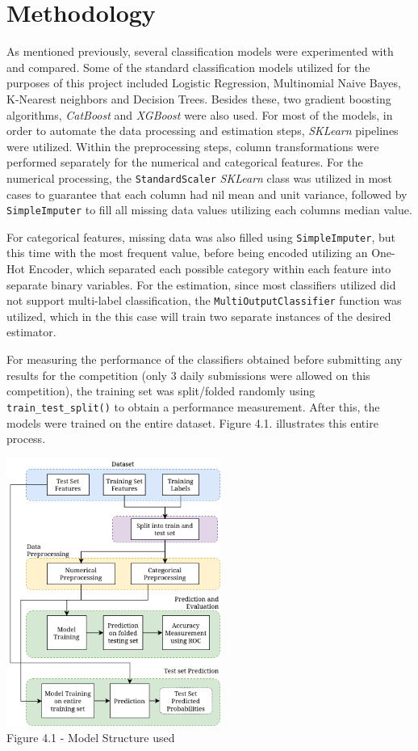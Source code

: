 \documentclass{IEEEtran}
\begin{document}
\section{Methodology}
As mentioned previously, several classification models were experimented with and compared. Some of the standard classification models utilized for the purposes of this project included Logistic Regression, Multinomial Naive Bayes, K-Nearest neighbors and Decision Trees. Besides these, two gradient boosting algorithms, \textit{CatBoost} and \textit{XGBoost} were also used.
For most of the models, in order to automate the data processing and estimation steps, \textit{SKLearn} pipelines were utilized. Within the preprocessing steps, column transformations were performed separately for the numerical and categorical features. For the numerical processing, the \texttt{StandardScaler} \textit{SKLearn}\cite{b3} class was utilized in most cases to guarantee that each column had nil mean and unit variance, followed by \texttt{SimpleImputer}\cite{b4} to fill all missing data values utilizing each columns median value.

For categorical features, missing data was also filled using \texttt{SimpleImputer}, but this time with the most frequent value, before being encoded utilizing an One-Hot Encoder, which separated each possible category within each feature into separate binary variables.
For the estimation, since most classifiers utilized did not support multi-label classification, the \texttt{MultiOutputClassifier}\cite{b5} function was utilized, which in the this case will train two separate instances of the desired estimator.

For measuring the performance of the classifiers obtained before submitting any results for the competition (only 3 daily submissions were allowed on this competition), the training set was split/folded randomly using \texttt{train\_test\_split()}\cite{b6} to obtain a performance measurement. After this, the models were trained on the entire dataset. Figure 4.1. illustrates this entire process.

\begin{center}
    \includegraphics[width=7cm]{figures/MethodologyStructure.png}\\
    Figure 4.1 - Model Structure used
\end{center}
\end{document}
